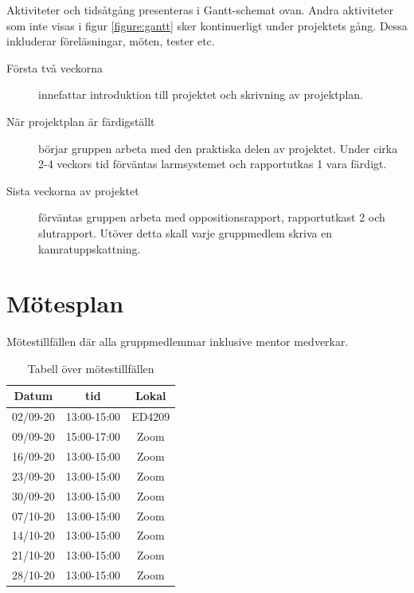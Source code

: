 \documentclass[a4paper]{article}
\begin{document}
Aktiviteter och tidsåtgång presenteras i Gantt-schemat ovan. Andra aktiviteter som inte visas i figur \ref{figure:gantt} sker kontinuerligt under projektets gång. Dessa inkluderar föreläsningar, möten, tester etc. 
\begin{description}
\item [Första två veckorna] innefattar introduktion till projektet och skrivning av projektplan.

\item [När projektplan är färdigställt] börjar gruppen arbeta med den praktiska delen av projektet. Under cirka 2-4 veckors tid förväntas larmsystemet och rapportutkas 1 vara färdigt. 

\item [Sista veckorna av projektet] förväntas gruppen arbeta med oppositionsrapport, rapportutkast 2 och slutrapport. Utöver detta skall varje gruppmedlem skriva en kamratuppskattning. 
\end{description}

\newpage

\section{Mötesplan}

Mötestillfällen där alla gruppmedlemmar inklusive mentor medverkar.

\begin{table}[H]
    \begin{center}
        \begin{tabular}{ |c|c|c| }\hline
            Datum & tid & Lokal \\\hline\hline
            02/09-20 & 13:00-15:00 & ED4209 \\\hline
            09/09-20 & 15:00-17:00 & Zoom \\\hline
            16/09-20 & 13:00-15:00 & Zoom \\\hline
            23/09-20 & 13:00-15:00 & Zoom \\\hline
            30/09-20 & 13:00-15:00 & Zoom \\\hline
            07/10-20 & 13:00-15:00 & Zoom \\\hline
            14/10-20 & 13:00-15:00 & Zoom \\\hline
            21/10-20 & 13:00-15:00 & Zoom \\\hline
            28/10-20 & 13:00-15:00 & Zoom \\\hline
        \end{tabular}
        \caption{Tabell över mötestillfällen}
        \label{table:motesplan}
    \end{center}
\end{table}
\end{document}
